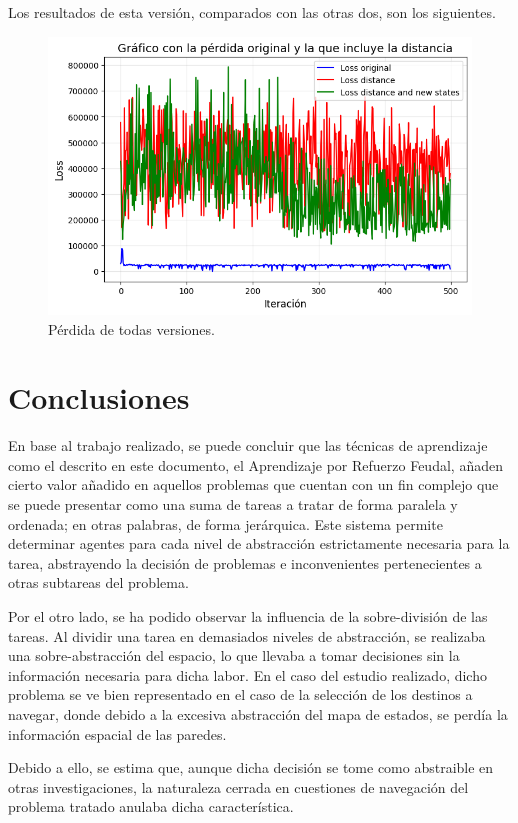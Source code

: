 \documentclass[letterpaper]{article} %
\begin{document}
Los resultados de esta versión, comparados con las otras dos, son los siguientes.
\begin{figure}[H]
    \centering
    \includegraphics[width=0.9\columnwidth]{FuN_3.png}
    \caption{Pérdida de todas versiones.\label{fig:FuN5}}
\end{figure}

\section{Conclusiones}
En base al trabajo realizado, se puede concluir que las técnicas de aprendizaje como el descrito en este documento, el Aprendizaje por Refuerzo Feudal, añaden cierto valor añadido en aquellos problemas que cuentan con un fin complejo que se puede presentar como una suma de tareas a tratar de forma paralela y ordenada; en otras palabras, de forma jerárquica. Este sistema permite determinar agentes para cada nivel de abstracción estrictamente necesaria para la tarea, abstrayendo la decisión de problemas e inconvenientes pertenecientes a otras subtareas del problema.

Por el otro lado, se ha podido observar la influencia de la sobre-división de las tareas. Al dividir una tarea en demasiados niveles de abstracción, se realizaba una sobre-abstracción del espacio, lo que llevaba a tomar decisiones sin la información necesaria para dicha labor. En el caso del estudio realizado, dicho problema se ve bien representado en el caso de la selección de los destinos a navegar, donde debido a la excesiva abstracción del mapa de estados, se perdía la información espacial de las paredes. 

Debido a ello, se estima que, aunque dicha decisión se tome como abstraible en otras investigaciones, la naturaleza cerrada en cuestiones de navegación del problema tratado anulaba dicha característica.



\end{document}
